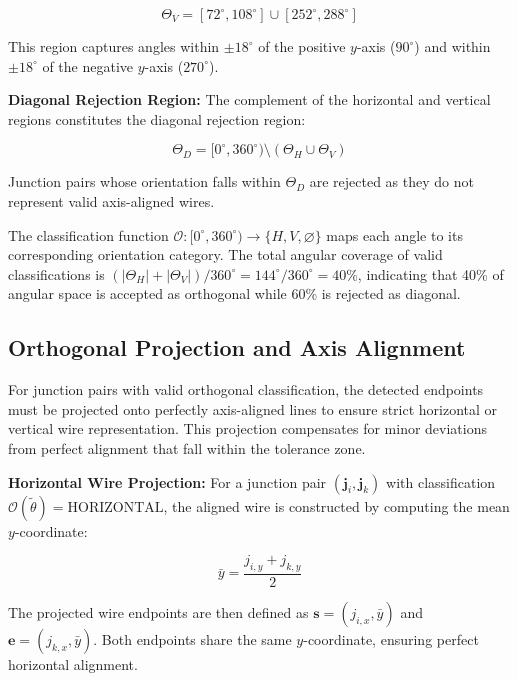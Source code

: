 \begin{equation}
\Theta_V = [72^\circ, 108^\circ] \cup [252^\circ, 288^\circ]
\label{eq:vertical-region}
\end{equation}

This region captures angles within $\pm 18^\circ$ of the positive $y$-axis ($90^\circ$) and within $\pm 18^\circ$ of the negative $y$-axis ($270^\circ$).

\textbf{Diagonal Rejection Region:} The complement of the horizontal and vertical regions constitutes the diagonal rejection region:

\begin{equation}
\Theta_D = [0^\circ, 360^\circ) \setminus (\Theta_H \cup \Theta_V)
\label{eq:diagonal-region}
\end{equation}

Junction pairs whose orientation falls within $\Theta_D$ are rejected as they do not represent valid axis-aligned wires.

The classification function $\mathcal{O} : [0^\circ, 360^\circ) \to \{H, V, \varnothing\}$ maps each angle to its corresponding orientation category. The total angular coverage of valid classifications is $(|\Theta_H| + |\Theta_V|)/360^\circ = 144^\circ/360^\circ = 40\%$, indicating that 40\% of angular space is accepted as orthogonal while 60\% is rejected as diagonal.

\subsection{Orthogonal Projection and Axis Alignment}

For junction pairs with valid orthogonal classification, the detected endpoints must be projected onto perfectly axis-aligned lines to ensure strict horizontal or vertical wire representation. This projection compensates for minor deviations from perfect alignment that fall within the tolerance zone.

\textbf{Horizontal Wire Projection:} For a junction pair $(\mathbf{j}_i, \mathbf{j}_k)$ with classification $\mathcal{O}(\tilde{\theta}) = \text{HORIZONTAL}$, the aligned wire is constructed by computing the mean $y$-coordinate:

\begin{equation}
\bar{y} = \frac{j_{i,y} + j_{k,y}}{2}
\label{eq:horizontal-projection}
\end{equation}

The projected wire endpoints are then defined as $\mathbf{s} = (j_{i,x}, \bar{y})$ and $\mathbf{e} = (j_{k,x}, \bar{y})$. Both endpoints share the same $y$-coordinate, ensuring perfect horizontal alignment.

